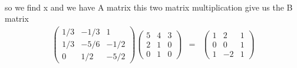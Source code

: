 \documentclass[11pt]{article}
\begin{document}
\paragraph{}so we find x and we have A matrix this two matrix multiplication give us the B matrix
\begin{eqnarray*}
\begin{pmatrix}
1/3 & -1/3 & 1\\
1/3 & -5/6 & -1/2\\
0 & 1/2 & -5/2
\end{pmatrix}
\begin{pmatrix}
5 & 4 & 3\\
2 & 1 & 0\\
0 & 1 & 0
\end{pmatrix}
&=&
\begin{pmatrix}
1 & 2 & 1\\
0 & 0 & 1\\
1 & -2 & 1
\end{pmatrix}
\end{eqnarray*}
\end{document}
